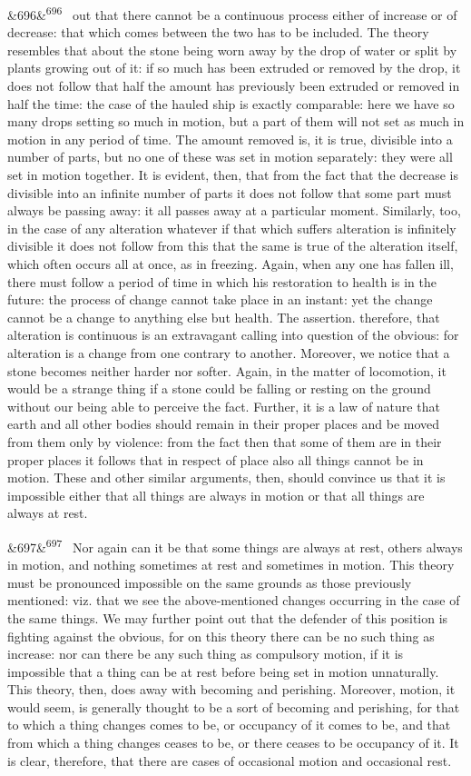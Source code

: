 \documentclass[12pt]{article}
\newcommand{\para}[1][]{\par\noindent\ifx&#1&\else\textsuperscript{\footnotesize #1}~\fi}
\begin{document}
\para[696] out that there cannot be a continuous process either of increase or of decrease: that which comes between the two has to be included. The theory resembles that about the stone being worn away by the drop of water or split by plants growing out of it: if so much has been extruded or removed by the drop, it does not follow that half the amount has previously been extruded or removed in half the time: the case of the hauled ship is exactly comparable: here we have so many drops setting so much in motion, but a part of them will not set as much in motion in any period of time. The amount removed is, it is true, divisible into a number of parts, but no one of these was set in motion separately: they were all set in motion together. It is evident, then, that from the fact that the decrease is divisible into an infinite number of parts it does not follow that some part must always be passing away: it all passes away at a particular moment. Similarly, too, in the case of any alteration whatever if that which suffers alteration is infinitely divisible it does not follow from this that the same is true of the alteration itself, which often occurs all at once, as in freezing. Again, when any one has fallen ill, there must follow a period of time in which his restoration to health is in the future: the process of change cannot take place in an instant: yet the change cannot be a change to anything else but health. The assertion. therefore, that alteration is continuous is an extravagant calling into question of the obvious: for alteration is a change from one contrary to another. Moreover, we notice that a stone becomes neither harder nor softer. Again, in the matter of locomotion, it would be a strange thing if a stone could be falling or resting on the ground without our being able to perceive the fact. Further, it is a law of nature that earth and all other bodies should remain in their proper places and be moved from them only by violence: from the fact then that some of them are in their proper places it follows that in respect of place also all things cannot be in motion. These and other similar arguments, then, should convince us that it is impossible either that all things are always in motion or that all things are always at rest.

\para[697] Nor again can it be that some things are always at rest, others always in motion, and nothing sometimes at rest and sometimes in motion. This theory must be pronounced impossible on the same grounds as those previously mentioned: viz. that we see the above-mentioned changes occurring in the case of the same things. We may further point out that the defender of this position is fighting against the obvious, for on this theory there can be no such thing as increase: nor can there be any such thing as compulsory motion, if it is impossible that a thing can be at rest before being set in motion unnaturally. This theory, then, does away with becoming and perishing. Moreover, motion, it would seem, is generally thought to be a sort of becoming and perishing, for that to which a thing changes comes to be, or occupancy of it comes to be, and that from which a thing changes ceases to be, or there ceases to be occupancy of it. It is clear, therefore, that there are cases of occasional motion and occasional rest.
\end{document}
